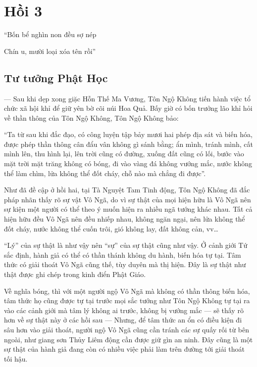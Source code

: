 \chapter{Hồi 3} %
\label{cha:hoi_3}

\begin{itshape}
``Bốn bể nghìn non đều sợ nép

Chín u, mười loại xóa tên rồi''
\end{itshape}

\section{Tư tưởng Phật Học} %
\label{sec:3_phat_hoc}

— Sau khi dẹp xong giặc Hỗn Thế Ma Vương, Tôn Ngộ Không tiến hành việc tổ chức xã hội khỉ để giữ yên bờ cõi núi Hoa Quả. Bấy giờ có bốn trưởng lão khỉ hỏi về thần thông của Tôn Ngộ Không, Tôn Ngộ Không bảo:

``Ta từ sau khi đắc đạo, có công luyện tập bảy mươi hai phép địa sát và biến hóa, được phép thần thông cân đẩu vân không gì sánh bằng; ẩn mình, tránh mình, cất mình lên, thu hình lại, lên trời cũng có đường, xuống đất cũng có lối, bước vào mặt trời mặt trăng không có bóng, đi vào vàng đá không vướng mắc, nước không thể làm chìm, lửa không thể đốt cháy, chỗ nào mà chẳng đi được''.

Như đã đề cập ở hồi hai, tại Tà Nguyệt Tam Tinh động, Tôn Ngộ Không đã đắc pháp nhãn thấy rõ sự vật Vô Ngã, do vì sự thật của mọi hiện hữu là Vô Ngã nên sự kiện một người có thể theo ý muốn hiện ra nhiều ngã tướng khác nhau. Tất cả hiện hữu đều Vô Ngã nên đều nhiếp nhau, không ngăn ngại, nên lửa không thể đốt cháy, nước không thể cuốn trôi, gió không lay, đất không cản, vv\ldots

``Lý'' của sự thật là như vậy nên ``sự'' của sự thật cũng như vậy. Ở cảnh giới Tứ sắc định, hành giả có thể có thần thánh không du hành, biến hóa tự tại. Tâm thức có giải thoát Vô Ngã cũng thế, tùy duyên mà thị hiện. Đây là sự thật như thật được ghi chép trong kinh điển Phật Giáo.

Về nghĩa bóng, thì với một người ngộ Vô Ngã mà không có thần thông biến hóa, tâm thức họ cũng được tự tại trước mọi sắc tướng như Tôn Ngộ Không tự tại ra vào các cảnh giới mà tâm lý không ai trước, không bị vướng mắc — sẽ thấy rõ hơn về sự thật này ở các hồi sau — Nhưng, để tâm thức an ổn có điều kiện đi sâu hơn vào giải thoát, người ngộ Vô Ngã cũng cần tránh các sự quấy rối từ bên ngoài, như giang sơn Thủy Liêm động cần được giữ gìn an ninh. Đây cũng là một sự thật của hành giả đang còn có nhiều việc phải làm trên đường tới giải thoát tối hậu.

